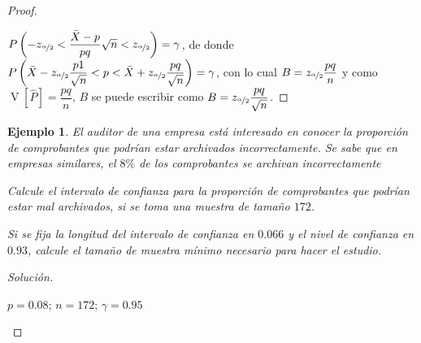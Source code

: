 \documentclass[a5paper,doc,10pt,noapacite]{apa6}
\DeclareMathOperator{\Var}{V}
\newtheorem{ejem}{Ejemplo}
\begin{document}
{{\begin{proof}
	\begin{figure}[H]
\hspace{-3.5em}
\begin{floatrow}
	\fontsize{8}{11}\selectfont
	\captionsetup{justification=centering, labelfont=footnotesize, font=footnotesize}
\end{floatrow}
\end{figure}
	
	\vspace{-3\baselineskip}
	\(P\left(-z_{\nicefrac{\alpha}{2}}<\dfrac{\bar{X}-p}{pq}\sqrt{n}<z_{\nicefrac{\alpha}{2}}\right)=\gamma\), de donde \(P\left(\bar{X}-z_{\nicefrac{\alpha}{2}}\dfrac{p1}{\sqrt{n}}<p<\bar{X}+z_{\nicefrac{\alpha}{2}}\dfrac{pq}{\sqrt{n}}\right)=\gamma\), con lo cual \(B=z_{\nicefrac{\alpha}{2}}\dfrac{pq}{n}\) y como \(\Var[\hat{P}]=\dfrac{pq}{n}\), \(B\) se puede escribir como \(B=z_{\nicefrac{\alpha}{2}}\dfrac{pq}{\sqrt{n}}\).
\end{proof}

\begin{ejem}
	El auditor de una empresa está interesado en conocer la proporción de comprobantes que podrían 	estar archivados incorrectamente. Se sabe que en empresas similares, el \(8\%\) de los comprobantes se archivan incorrectamente
	\begin{APAenumerate}
		\item Calcule el intervalo de confianza para la proporción de comprobantes que podrían estar mal archivados, si se toma una muestra de tamaño \(172\).
		\item Si se fija la longitud del intervalo de confianza en \(0.066\) y el nivel de confianza en \(0.93\), calcule el tamaño de muestra mínimo necesario para hacer el estudio.
	\end{APAenumerate}
\end{ejem}
\begin{proof}[Solución]\quad
	\begin{APAenumerate}
		\item \(p=0.08\); \(n=172\); \(\gamma=0.95\)
		

\end{APAenumerate}
\end{proof}}}
\end{document}
